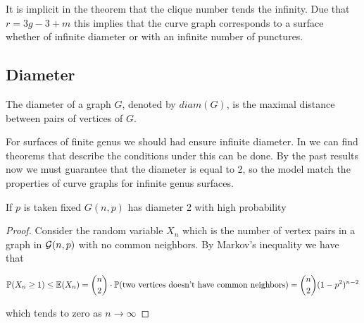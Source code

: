 It is implicit in the theorem that the clique number tends the infinity. Due that $r=3g-3+m$ this implies that the curve graph corresponds to a surface whether of infinite diameter or with an infinite number of punctures.

\subsection{Diameter}

The diameter of a graph $G$, denoted by $diam(G)$, is the maximal distance between pairs of vertices of $G$.

For surfaces of finite genus we should had ensure infinite diameter. In \cite[Bollobás, p.259]{Bollobas} we can find theorems that describe the conditions under this can be done. By the past results now we must guarantee that the diameter is equal to 2, so the model match the properties of curve graphs for infinite genus surfaces.


\begin{theorem}
If $p$ is taken fixed $G(n,p)$ has diameter 2 with high probability 
\end{theorem}

\begin{proof}
Consider the random variable $X_{n}$ which is the number of vertex pairs in a graph in $\mathcal{G}(n,p)$ with no common neighbors. By Markov's inequality we have that

$$\mathbb{P}(X_{n} \geq 1)\leq \mathbb{E}(X_{n}) = \binom{n}{2} \cdot \mathbb{P}(\text{two vertices doesn't have common neighbors}) = \binom{n}{2} (1-p^{2})^{n-2}$$

which tends to zero as $n\to \infty$
\end{proof}




